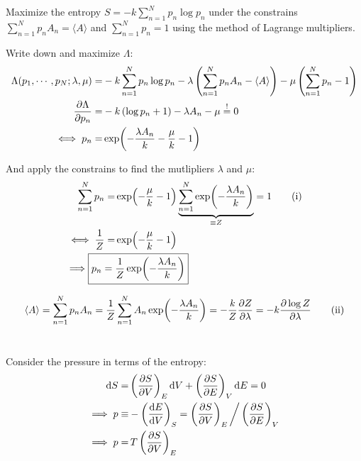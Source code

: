 \documentclass[11pt,a4paper]{scrartcl}
\newcommand{\hwnumber}{3}
\newcommand{\sumN}{\ensuremath{\sum_{n=1}^{N}}}
\newcommand{\EA}{\ensuremath{\langle A \rangle}}
\begin{document}
\section{}

Maximize the entropy $S=-k\sumN p_n \log p_n$ under the constrains
$\sumN p_n A_n=\EA$ and $\sumN p_n=1$ using the method of Lagrange
multipliers.

Write down and maximize $\Lambda$:
\begin{align*}
    \Lambda(p_1,\cdots,p_N;\lambda,\mu)
    =& -k\sumN p_n \log p_n -\lambda\left(\sumN p_n A_n -\EA\right)
    -\mu\left(\sumN p_n -1\right) \\
    \pdv{\Lambda}{p_n}=&-k\left(\log p_n + 1\right) -\lambda A_n -\mu
    \overset{!}{=}0 \\
    \iff p_n=& \exp(-\frac{\lambda A_n}{k}-\frac{\mu}{k}-1)
\end{align*}

And apply the constrains to find the mutlipliers $\lambda$ and $\mu$:
\begin{align*}
    \sumN p_n =& \exp(-\frac{\mu}{k}-1)
    \underbrace{%
        \sumN\exp(-\frac{\lambda A_n}{k})
    }_{\equiv Z} = 1 \tag{i}\\
    \iff\frac{1}{Z}=&\exp(-\frac{\mu}{k}-1) \\
    \implies\Aboxed{p_n=&\frac{1}{Z}\exp(-\frac{\lambda A_n}{k})}
\end{align*}

\begin{equation*}
    \EA = \sumN p_n A_n = \frac{1}{Z}\sumN A_n \exp(-\frac{\lambda A_n}{k})
    = -\frac{k}{Z}\pdv{Z}{\lambda}=-k\pdv{\log Z}{\lambda} \tag{ii}
\end{equation*}

\newpage

\section{}
    Consider the pressure in terms of the entropy:
    \begin{align*}
        \dd{S}=&\left(\pdv{S}{V}\right)_{E}\dd{V}+\left(\pdv{S}{E}\right)_{V}\dd{E}=0 \\
        \implies p\equiv&-\left(\dv{E}{V}\right)_{S}=
        \left(\pdv{S}{V}\right)_{E}\bigg/\left(\pdv{S}{E}\right)_{V} \\
        \implies p=&\,T\left(\pdv{S}{V}\right)_E
    \end{align*}
\end{document}
